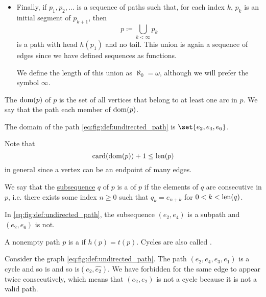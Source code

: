 \begin{definition}
\begin{itemize}
    \item Finally, if \( p_1, p_2, \ldots \) is a sequence of paths such that, for each index \( k \), \( p_k \) is an initial segment of \( p_{k + 1} \), then
    \begin{equation*}
      p \coloneqq \bigcup_{k < \infty} p_k
    \end{equation*}
    is a path with head \( h(p_1) \) and no tail. This union is again a sequence of edges since we have defined sequences as functions.

    We define the length of this union as \( \aleph_0 = \omega \), although we will prefer the symbol \( \infty \).
  \end{itemize}

  \begin{thmenum}
     The  \( \operatorname{dom}(p) \) of \( p \) is the set of all vertices that belong to at least one arc in \( p \). We say that the path  each member of \( \operatorname{dom}(p) \).

    The domain of the path \eqref{eq:fig:def:undirected_path} is \( \set{ e_2, e_4, e_6 } \).

    Note that
    \begin{equation}\label{eq:def:undirected_multigraph_path/length_and_domain}
      \operatorname{card}(\operatorname{dom}(p)) + 1 \leq \operatorname{len}(p)
    \end{equation}
    in general since a vertex can be an endpoint of many edges.

     We say that the \hyperref[def:subsequence]{subsequence} \( q \) of \( p \) is a  of \( p \) if the elements of \( q \) are consecutive in \( p \), i.e. there exists some index \( n \geq 0 \) such that \( q_k = e_{n + k} \) for \( 0 < k < \operatorname{len}(q) \).

    In \eqref{eq:fig:def:undirected_path}, the subsequence \( (e_2, e_4) \) is a subpath and \( (e_2, e_6) \) is not.

     A nonempty path \( p \) is a  if \( h(p) = t(p) \). Cycles are also called .

    Consider the graph \eqref{eq:fig:def:undirected_path}. The path \( (e_2, e_4, e_3, e_1) \) is a cycle and so is and so is\( (e_2, {\widehat{e_2}}) \). We have forbidden for the same edge to appear twice consecutively, which means that \( (e_2, e_2) \) is not a cycle because it is not a valid path.


\end{thmenum}
\end{definition}
